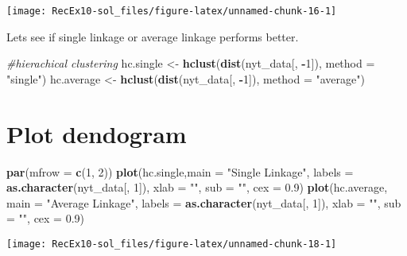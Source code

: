 \documentclass[
]{article}
\newenvironment{Shaded}{\begin{snugshade}}{\end{snugshade}}
\newcommand{\AttributeTok}[1]{\textcolor[rgb]{0.13,0.29,0.53}{#1}}
\newcommand{\CommentTok}[1]{\textcolor[rgb]{0.56,0.35,0.01}{\textit{#1}}}
\newcommand{\DecValTok}[1]{\textcolor[rgb]{0.00,0.00,0.81}{#1}}
\newcommand{\FloatTok}[1]{\textcolor[rgb]{0.00,0.00,0.81}{#1}}
\newcommand{\FunctionTok}[1]{\textcolor[rgb]{0.13,0.29,0.53}{\textbf{#1}}}
\newcommand{\NormalTok}[1]{#1}
\newcommand{\OtherTok}[1]{\textcolor[rgb]{0.56,0.35,0.01}{#1}}
\newcommand{\SpecialCharTok}[1]{\textcolor[rgb]{0.81,0.36,0.00}{\textbf{#1}}}
\newcommand{\StringTok}[1]{\textcolor[rgb]{0.31,0.60,0.02}{#1}}
\begin{document}
\begin{center}\texttt{[image: RecEx10-sol\_files/figure-latex/unnamed-chunk-16-1]} \end{center}

Lets see if single linkage or average linkage performs better.

\begin{Shaded}
\begin{Highlighting}[]
\CommentTok{\#hierachical clustering}
\NormalTok{hc.single }\OtherTok{\textless{}{-}} \FunctionTok{hclust}\NormalTok{(}\FunctionTok{dist}\NormalTok{(nyt\_data[, }\SpecialCharTok{{-}}\DecValTok{1}\NormalTok{]), }\AttributeTok{method =} \StringTok{"single"}\NormalTok{)}
\NormalTok{hc.average }\OtherTok{\textless{}{-}} \FunctionTok{hclust}\NormalTok{(}\FunctionTok{dist}\NormalTok{(nyt\_data[, }\SpecialCharTok{{-}}\DecValTok{1}\NormalTok{]), }\AttributeTok{method =} \StringTok{"average"}\NormalTok{)}
\end{Highlighting}
\end{Shaded}

\section{Plot dendogram}\label{plot-dendogram}

\begin{Shaded}
\begin{Highlighting}[]
\FunctionTok{par}\NormalTok{(}\AttributeTok{mfrow =} \FunctionTok{c}\NormalTok{(}\DecValTok{1}\NormalTok{, }\DecValTok{2}\NormalTok{))}
\FunctionTok{plot}\NormalTok{(hc.single,}\AttributeTok{main =} \StringTok{"Single Linkage"}\NormalTok{, }
     \AttributeTok{labels =} \FunctionTok{as.character}\NormalTok{(nyt\_data[, }\DecValTok{1}\NormalTok{]),}
     \AttributeTok{xlab =} \StringTok{""}\NormalTok{,}
     \AttributeTok{sub =} \StringTok{""}\NormalTok{,}
     \AttributeTok{cex =} \FloatTok{0.9}\NormalTok{)}
\FunctionTok{plot}\NormalTok{(hc.average,}
     \AttributeTok{main =} \StringTok{"Average Linkage"}\NormalTok{, }
     \AttributeTok{labels =} \FunctionTok{as.character}\NormalTok{(nyt\_data[, }\DecValTok{1}\NormalTok{]),}
     \AttributeTok{xlab =} \StringTok{""}\NormalTok{,}
     \AttributeTok{sub =} \StringTok{""}\NormalTok{,}
     \AttributeTok{cex =} \FloatTok{0.9}\NormalTok{)}
\end{Highlighting}
\end{Shaded}

\begin{center}\texttt{[image: RecEx10-sol\_files/figure-latex/unnamed-chunk-18-1]} \end{center}
\end{document}
